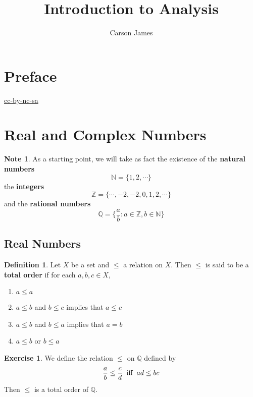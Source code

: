 \documentclass[12pt]{amsart}
\theoremstyle{definition}
\newtheorem{defn}[definition]{Definition}
\newtheorem{note}[definition]{Note}
\newtheorem{ex}[definition]{Exercise}
\newcommand{\N}{\mathbb{N}}
\newcommand{\Z}{\mathbb{Z}}
\newcommand{\Q}{\mathbb{Q}}
\newcommand{\lex}[1]{\label{ex:#1}}
\newcommand{\ld}[1]{\label{defn:#1}}
\begin{document}
	
	\title{Introduction to Analysis}
	\author{Carson James}
	\maketitle
	
	\tableofcontents
	
	\section*{Preface}
	\begin{flushleft}
		\href{https://creativecommons.org/licenses/by-nc-sa/4.0/legalcode.txt}{cc-by-nc-sa}
	\end{flushleft}

	
	
	\newpage
	

	\newpage
	
	\section{Real and Complex Numbers}
	\begin{note}
		As a starting point, we will take as fact the existence of the \textbf{natural numbers} $$\N = \{1, 2, \cdots\}$$ the \textbf{integers} $$\Z = \{\cdots, -2, -2, 0, 1, 2, \cdots\}$$ and the \textbf{rational numbers} $$\Q = \bigg \{\frac{a}{b}: a \in \Z, b \in \N \bigg \}$$
	\end{note}
	\subsection{Real Numbers}
	
	\begin{defn} \ld{}
		Let $X$ be a set and $\leq$ a relation on $X$. Then $\leq$ is said to be a \textbf{total order} if for each $a,b,c \in X$,
		\begin{enumerate}
			\item $a \leq a$
			\item $a \leq b$ and $b \leq c$ implies that $a \leq  c$ 
			\item $a \leq b$ and $b \leq a$ implies that $a = b$ 
			\item $a \leq b$ or $b \leq a$
		\end{enumerate}
	\end{defn}

	\begin{ex} \lex{}
		We define the relation $\leq$ on $\Q$ defined by $$\frac{a}{b} \leq \frac{c}{d} \hspace{.2cm} \text{iff} \hspace{.2cm} ad \leq bc$$ Then $\leq$ is a total order of $\Q$.
	\end{ex}
\end{document}
